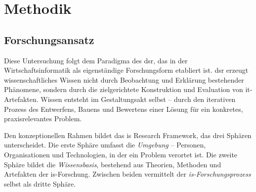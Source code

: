 \section{Methodik}

\subsection{Forschungsansatz}

Diese Untersuchung folgt dem Paradigma des \gls{dsr}, das in der Wirtschaftsinformatik als eigenständige Forschungsform etabliert ist.
\gls{dsr} erzeugt wissenschaftliches Wissen nicht durch Beobachtung und Erklärung bestehender Phänomene, sondern durch die zielgerichtete Konstruktion und Evaluation von \gls{it}-Artefakten.
Wissen entsteht im Gestaltungsakt selbst -- durch den iterativen Prozess des Entwerfens, Bauens und Bewertens einer Lösung für ein konkretes, praxisrelevantes Problem.

Den konzeptionellen Rahmen bildet das \gls{is} Research Framework, das drei Sphären unterscheidet.
Die erste Sphäre umfasst die \textit{Umgebung} -- Personen, Organisationen und Technologien, in der ein Problem verortet ist.
Die zweite Sphäre bildet die \textit{Wissensbasis}, bestehend aus Theorien, Methoden und Artefakten der \gls{is}-Forschung.
Zwischen beiden vermittelt der \textit{\gls{is}-Forschungsprozess} selbst als dritte Sphäre.

